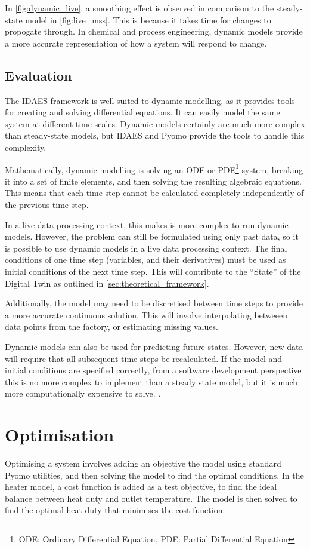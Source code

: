 \documentclass[12pt]{article}
\begin{document}
In \cref{fig:dynamic_live}, a smoothing effect is observed in comparison to the steady-state model in \cref{fig:live_mss}. This is because it takes time for changes to propogate through. In chemical and process engineering, dynamic models provide a more accurate representation of how a system will respond to change. \cite{CITATION_NEEDED}


\subsection{Evaluation}
The IDAES framework is well-suited to dynamic modelling, as it provides tools for creating and solving differential equations. It can easily model the same system at different time scales. Dynamic models certainly are much more complex than steady-state models, but IDAES and Pyomo provide the tools to handle this complexity.

Mathematically, dynamic modelling is solving an ODE or PDE\footnote{ODE: Ordinary Differential Equation, PDE: Partial Differential Equation} system, breaking it into a set of finite elements, and then solving the resulting algebraic equations. This means that each time step cannot be calculated completely independently of the previous time step.

In a live data processing context, this makes is more complex to run dynamic models. 
However, the problem can still be formulated using only past data, so it is possible to use dynamic models in a live data processing context.
The final conditions of one time step (variables, and their derivatives) must be used as initial conditions of the next time step. This will contribute to the ``State'' of the Digital Twin as outlined in \cref{sec:theoretical_framework}.

Additionally, the model may need to be discretised between time steps to provide a more accurate continuous solution. This will involve interpolating betweeen data points from the factory, or estimating missing values.


Dynamic models can also be used for predicting future states. However, new data will require that all subsequent time steps be recalculated. 
If the model and initial conditions are specified correctly, from a software development perspective this is no more complex to implement than a steady state model, but it is much more computationally expensive to solve. 
.

\section{Optimisation}
Optimising a system involves adding an objective the model using standard Pyomo utilities, and then solving the model to find the optimal conditions. In the heater model, a cost function is added as a test objective, to find the ideal balance between heat duty and outlet temperature. The model is then solved to find the optimal heat duty that minimises the cost function.
\end{document}
